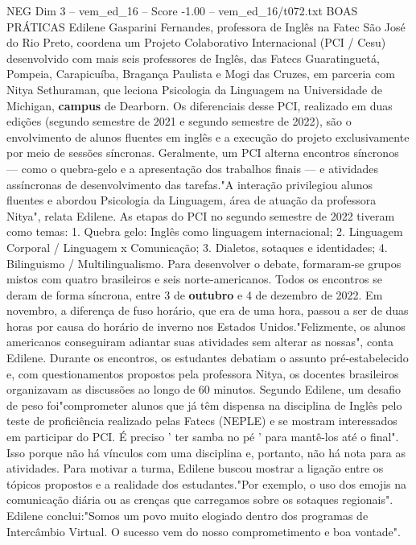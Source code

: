 \begin{textsample}{NEG Dim 3 – vem\_ed\_16 – Score -1.00 – vem\_ed\_16/t072.txt}  \label{ex:f3_neg_017}
BOAS PRÁTICAS Edilene Gasparini Fernandes, professora de Inglês na Fatec São José do Rio Preto, coordena um Projeto Colaborativo Internacional (PCI / Cesu) desenvolvido com mais seis professores de Inglês, das Fatecs Guaratinguetá, Pompeia, Carapicuíba, Bragança Paulista e Mogi das Cruzes, em parceria com Nitya Sethuraman, que leciona Psicologia da Linguagem na Universidade de Michigan, \textbf{campus} de Dearborn.
Os diferenciais desse PCI, realizado em duas edições (segundo semestre de 2021 e segundo semestre de 2022), são o envolvimento de alunos fluentes em inglês e a execução do projeto exclusivamente por meio de sessões síncronas.
Geralmente, um PCI alterna encontros síncronos — como o quebra-gelo e a apresentação dos trabalhos finais — e atividades assíncronas de desenvolvimento das tarefas."A interação privilegiou alunos fluentes e abordou Psicologia da Linguagem, área de atuação da professora Nitya", relata Edilene.
As etapas do PCI no segundo semestre de 2022 tiveram como temas: 1.
Quebra gelo: Inglês como linguagem internacional; 2.
Linguagem Corporal / Linguagem x Comunicação; 3.
Dialetos, sotaques e identidades; 4.
Bilinguismo / Multilingualismo.
Para desenvolver o debate, formaram-se grupos mistos com quatro brasileiros e seis norte-americanos.
Todos os encontros se deram de forma síncrona, entre 3 de \textbf{outubro} e 4 de dezembro de 2022.
Em novembro, a diferença de fuso horário, que era de uma hora, passou a ser de duas horas por causa do horário de inverno nos Estados Unidos."Felizmente, os alunos americanos conseguiram adiantar suas atividades sem alterar as nossas", conta Edilene.
Durante os encontros, os estudantes debatiam o assunto pré-estabelecido e, com questionamentos propostos pela professora Nitya, os docentes brasileiros organizavam as discussões ao longo de 60 minutos.
Segundo Edilene, um desafio de peso foi"comprometer alunos que já têm dispensa na disciplina de Inglês pelo teste de proficiência realizado pelas Fatecs (NEPLE) e se mostram interessados em participar do PCI.
É preciso ' ter samba no pé ' para mantê-los até o final".
Isso porque não há vínculos com uma disciplina e, portanto, não há nota para as atividades.
Para motivar a turma, Edilene buscou mostrar a ligação entre os tópicos propostos e a realidade dos estudantes."Por exemplo, o uso dos emojis na comunicação diária ou as crenças que carregamos sobre os sotaques regionais".
Edilene conclui:"Somos um povo muito elogiado dentro dos programas de Intercâmbio Virtual.
O sucesso vem do nosso comprometimento e boa vontade".

\end{textsample}
